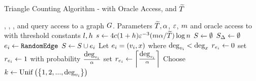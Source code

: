 \begin{algorithm}[ht!]
    \caption{Triangle Counting Algorithm - with Oracle Access, and $\widetilde{T}$}\label{Algorithm: Random Edge Arboricity Triangle Counting Oracle Triangle Estimate}
    \begin{algorithmic}[1]
        \Require \degreeq{}, \neighbourq{}, \edgeexistsq{}, and \randedgeq{} query access to a graph $G$. Parameters $\widetilde{T}, \alpha$, $\varepsilon$, $m$ and oracle access to \exactheavyoracle{} with threshold constants $l,h$
        \State $s \gets 4c(1+h)\varepsilon^{-3}(m\alpha/\widetilde{T})\log n$ 
        \State $S \gets \emptyset$ 
        \State $S_\Delta \gets \emptyset$ 
            \State $e_i \gets \texttt{RandomEdge}{}$
            \State $S \gets S \cup e_i$
            \State Let $e_i = (v_i, x)$ where $\mbox{deg}_{v_i} < \mbox{deg}_{x}$
             
              
            \label{line: heavyoracle call}
                \State $r_{e_i} \gets 0$ 
                    \State set $r_{e_i} \gets 1$ with probability $\frac{\mbox{deg}_{v_i}}{\alpha}$
                \Else 
                    \State set $r_{e_i} \gets \left\lceil{\frac{\mbox{deg}_{v_i}}{\alpha}}\right\rceil$
                \EndIf
                \State Choose $k \gets \mathrm{Unif}\left({\left\{{1,2,...,\mbox{deg}_{v_i}}\right\}}\right)$

\end{algorithmic}
\end{algorithm}
